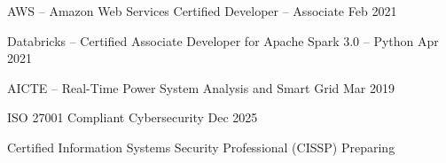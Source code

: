 
\begin{cvhonors}
  \cvhonor
    {AWS -- Amazon Web Services Certified Developer – Associate} %
    {Feb 2021} %

  \cvhonor
    {Databricks -- Certified Associate Developer for Apache Spark 3.0 – Python} %
    {Apr 2021} %

  \cvhonor
    {AICTE -- Real-Time Power System Analysis and Smart Grid} %
    {Mar 2019} %

  \cvhonor
    {ISO 27001 Compliant Cybersecurity} %
    {Dec 2025} %

  \cvhonor
    {Certified Information Systems Security Professional (CISSP)} %
    {Preparing} %
\end{cvhonors}